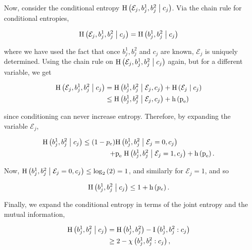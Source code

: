 Now, consider the conditional entropy $\text{H}\left(\mathcal{E}_j, b_j^1, b_j^2 \; \middle| \; c_j\right)$. Via the chain rule for conditional entropies,

\begin{equation*}
\text{H}\left(\mathcal{E}_j, b_j^1, b_j^2 \; \middle| \; c_j\right) = \text{H}\left(b_j^1, b_j^2 \; \middle| \; c_j\right)
\end{equation*}

\noindent where we have used the fact that once $b_j^1, b_j^2$ and $c_j$ are known, $\mathcal{E}_j$ is uniquely determined. Using the chain rule on $\text{H}\left(\mathcal{E}_j, b_j^1, b_j^2 \; \middle| \; c_j\right)$ again, but for a different variable, we get

\begin{align*}
\text{H}\left(\mathcal{E}_j, b_j^1, b_j^2 \; \middle| \; c_j\right) &= \text{H}\left(b_j^1, b_j^2 \; \middle| \; \mathcal{E}_j, c_j\right) + \text{H}\left(\mathcal{E}_j \; \middle| \; c_j\right) \notag \\
&\le \text{H}\left(b_j^1, b_j^2 \; \middle| \; \mathcal{E}_j, c_j\right) + \text{h}\left(\text{p}_{\text{e}}\right)
\end{align*}

\noindent since conditioning can never increase entropy. Therefore, by expanding the variable $\mathcal{E}_j$,

\begin{align*}
\text{H}\left(b_j^1, b_j^2 \; \middle| \; c_j\right) \le \left(1 - p_e\right)& \text{H}\left(b_j^1, b_j^2 \; \middle| \; \mathcal{E}_j = 0, c_j\right) \\ + &\text{p}_{\text{e}} \; \text{H}\left(b_j^1, b_j^2 \; \middle| \; \mathcal{E}_j=1, c_j\right) + \text{h}\left(\text{p}_{\text{e}}\right).
\end{align*}

\noindent Now, $\text{H}\left(b_j^1, b_j^2 \; \middle| \; \mathcal{E}_j=0, c_j\right) \le \log_2\left(2\right) = 1$, and similarly for $\mathcal{E}_j=1$, and so

\begin{equation}\label{eqn:A7}
\text{H}\left(b_j^1, b_j^2 \; \middle| \; c_j\right) \le 1 + \text{h}\left(p_e\right).
\end{equation}

\noindent Finally, we expand the conditional entropy in terms of the joint entropy and the mutual information,

\begin{align}\label{eqn:A8}
\text{H}\left(b_j^1, b_j^2 \; \middle| \; c_j\right) &= \text{H}\left(b_j^1, b_j^2\right) - \text{I}\left(b_j^1, b_j^2 : c_j\right) \notag \\
&\ge 2 - \chi\left(b_j^1, b_j^2 : c_j\right),
\end{align}

